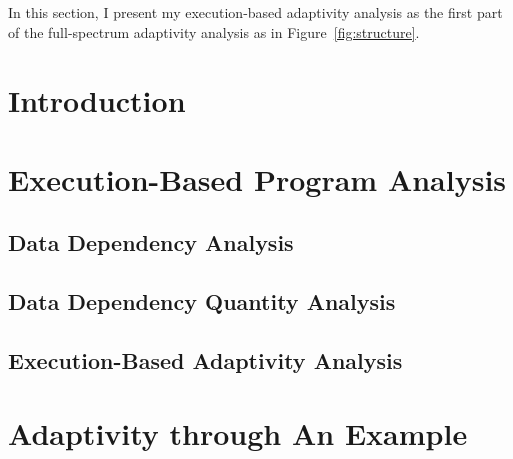 In this section, I present my 
execution-based adaptivity analysis as the first part of the full-spectrum adaptivity analysis as in Figure~\ref{fig:structure}. 
\section{Introduction}
\label{sec:dynamic-intro}
% 


\section{Execution-Based Program Analysis}
\label{sec:dynamic-analysis}

\subsection{Data Dependency Analysis}
\label{subsec:dynamic-datadep}


\subsection{Data Dependency Quantity Analysis}
\label{subsec:dynamic-reachability}
%

\subsection{Execution-Based Adaptivity Analysis}
\label{subsec:dynamic-adapt}
%
%
\section{Adaptivity through An Example}
\label{sec:dynamic-examples}


%
